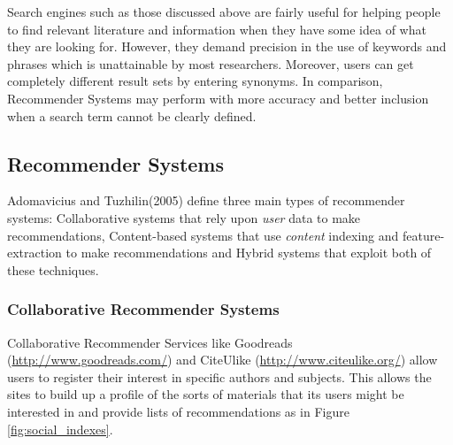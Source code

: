 Search engines such as those discussed above are fairly useful for helping
people to find relevant literature and information when they have some idea of
what they are looking for. However, they demand precision in the use of
keywords and phrases which is unattainable by most researchers. Moreover, users
can get completely different result sets by entering synonyms. In comparison,
Recommender Systems may perform with more accuracy and better inclusion when
a search term cannot be clearly defined.

\subsection{Recommender Systems}

Adomavicius and Tuzhilin(2005) define three main types of recommender systems:
Collaborative systems that rely upon \emph{user} data to make recommendations,
Content-based systems that use \emph{content} indexing and feature-extraction
to make recommendations and Hybrid systems that exploit both of these
techniques\cite{adomavicius2005toward}. 

\subsubsection{Collaborative Recommender Systems}

Collaborative Recommender Services like Goodreads
(\url{http://www.goodreads.com/}) and CiteUlike
(\url{http://www.citeulike.org/}) allow users to register their interest in
specific authors and subjects. This allows the sites to build up a profile of
the sorts of materials that its users might be interested in and provide lists
of recommendations as in Figure \ref{fig:social_indexes}.

